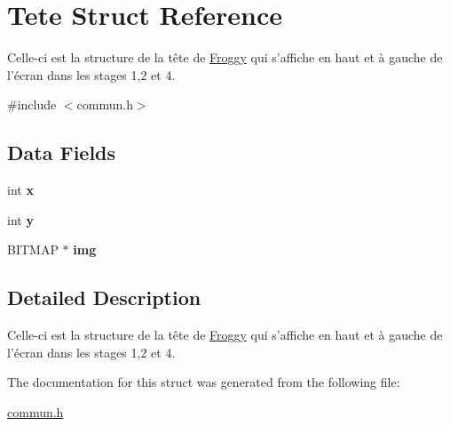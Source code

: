 \hypertarget{struct_tete}{\section{Tete Struct Reference}
\label{struct_tete}
}


Celle-\/ci est la structure de la tête de \hyperlink{struct_froggy}{Froggy} qui s'affiche en haut et à gauche de l'écran dans les stages 1,2 et 4.  




{\ttfamily \#include $<$commun.\-h$>$}

\subsection*{Data Fields}
\begin{DoxyCompactItemize}
\item 
\hypertarget{struct_tete_a6150e0515f7202e2fb518f7206ed97dc}{int {\bfseries x}}\label{struct_tete_a6150e0515f7202e2fb518f7206ed97dc}

\item 
\hypertarget{struct_tete_a0a2f84ed7838f07779ae24c5a9086d33}{int {\bfseries y}}\label{struct_tete_a0a2f84ed7838f07779ae24c5a9086d33}

\item 
\hypertarget{struct_tete_a8eae42c4d58d3ee6b9aa56d0071971fa}{B\-I\-T\-M\-A\-P $\ast$ {\bfseries img}}\label{struct_tete_a8eae42c4d58d3ee6b9aa56d0071971fa}

\end{DoxyCompactItemize}


\subsection{Detailed Description}
Celle-\/ci est la structure de la tête de \hyperlink{struct_froggy}{Froggy} qui s'affiche en haut et à gauche de l'écran dans les stages 1,2 et 4. 


\begin{DoxyItemize}
\item 
\end{DoxyItemize}

The documentation for this struct was generated from the following file\-:\begin{DoxyCompactItemize}
\item 
\hyperlink{commun_8h}{commun.\-h}\end{DoxyCompactItemize}
